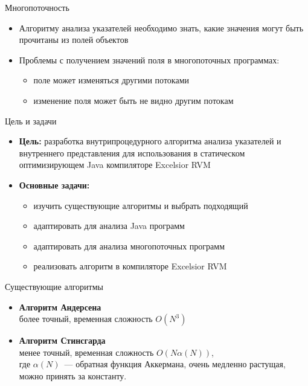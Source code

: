 \documentclass[usenames,dvipsnames,pdftex,unicode]{beamer}
\begin{document}
\begin{frame}{Многопоточность}

  \begin{itemize}
    \item<1-> Алгоритму анализа указателей необходимо знать, какие значения
          могут быть прочитаны из полей объектов
    \item<1-> Проблемы с получением значений поля в многопоточных программах:
          \begin{itemize}
            \item<2-> поле может изменяться другими потоками
            \item<3-> изменение поля может быть не видно другим потокам
          \end{itemize}
  \end{itemize}

\end{frame}

\begin{frame}{Цель и задачи}

  \begin{itemize}
    \item \textbf{Цель:}
          разработка внутрипроцедурного алгоритма анализа указателей и
          внутреннего представления для использования в статическом
          оптимизирующем Java компиляторе Excelsior RVM
    \item \textbf{Основные задачи:}
      \begin{itemize}
        \item изучить существующие алгоритмы и выбрать подходящий
        \item адаптировать для анализа Java программ
        \item адаптировать для анализа многопоточных программ
        \item реализовать алгоритм в компиляторе Excelsior RVM
      \end{itemize}
  \end{itemize}

\end{frame}

\begin{frame}{Существующие алгоритмы}

  \begin{itemize}
    \item \textbf{Алгоритм Андерсена}\\более точный, временная сложность $O(N^3)$
    \item \textbf{Алгоритм Стинсгарда}\\менее точный, временная сложность $O(N
          \alpha(N))$,\\где $\alpha(N)$~--- обратная функция Аккермана, очень
          медленно растущая, можно принять за константу.
  \end{itemize}

\end{frame}
\end{document}
